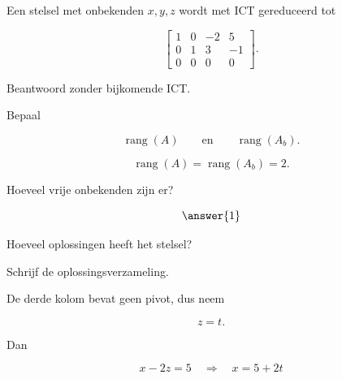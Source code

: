\documentclass{ximera}
\begin{document}
\begin{oefening}{\oefU\ESS}

Een stelsel met onbekenden \(x,y,z\) wordt met ICT gereduceerd tot

\[
\left[
\begin{array}{ccc|c}
1&0&-2&5\\
0&1&3&-1\\
0&0&0&0
\end{array}
\right].
\]

Beantwoord zonder bijkomende ICT.


\begin{question}

Bepaal

\[
\operatorname{rang}(A)
\qquad\text{en}\qquad
\operatorname{rang}(A_b).
\]

\begin{oplossing}

\[
\operatorname{rang}(A)
=
\operatorname{rang}(A_b)
=
2.
\]

\end{oplossing}

\end{question}


\begin{question}

Hoeveel vrije onbekenden zijn er?

\[
\answer{1}
\]

\end{question}


\begin{question}

Hoeveel oplossingen heeft het stelsel?

\begin{multipleChoice}
\end{multipleChoice}

\end{question}


\begin{question}

Schrijf de oplossingsverzameling.

\begin{oplossing}

De derde kolom bevat geen pivot, dus neem

\[
z=t.
\]

Dan

\[
x-2z=5
\quad\Longrightarrow\quad
x=5+2t
\]


\end{oplossing}
\end{question}
\end{oefening}
\end{document}
